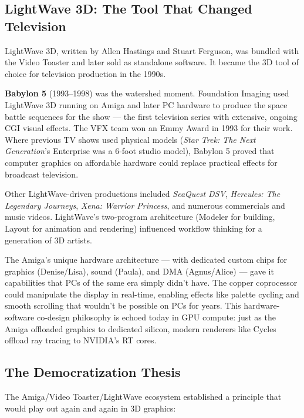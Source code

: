 \documentclass[11pt,letterpaper,twoside,openright]{book}
\begin{document}
\subsection{LightWave 3D: The Tool That Changed Television}

LightWave 3D, written by Allen Hastings and Stuart Ferguson, was bundled with the Video Toaster and later sold as standalone software. It became the 3D tool of choice for television production in the 1990s.

\textbf{Babylon 5} (1993--1998) was the watershed moment. Foundation Imaging used LightWave 3D running on Amiga and later PC hardware to produce the space battle sequences for the show --- the first television series with extensive, ongoing CGI visual effects. The VFX team won an Emmy Award in 1993 for their work. Where previous TV shows used physical models (\textit{Star Trek: The Next Generation}'s Enterprise was a 6-foot studio model), Babylon 5 proved that computer graphics on affordable hardware could replace practical effects for broadcast television.

Other LightWave-driven productions included \textit{SeaQuest DSV}, \textit{Hercules: The Legendary Journeys}, \textit{Xena: Warrior Princess}, and numerous commercials and music videos. LightWave's two-program architecture (Modeler for building, Layout for animation and rendering) influenced workflow thinking for a generation of 3D artists.

\begin{historynote}
The Amiga's unique hardware architecture --- with dedicated custom chips for graphics (Denise/Lisa), sound (Paula), and DMA (Agnus/Alice) --- gave it capabilities that PCs of the same era simply didn't have. The copper coprocessor could manipulate the display in real-time, enabling effects like palette cycling and smooth scrolling that wouldn't be possible on PCs for years. This hardware-software co-design philosophy is echoed today in GPU compute: just as the Amiga offloaded graphics to dedicated silicon, modern renderers like Cycles offload ray tracing to NVIDIA's RT cores.
\end{historynote}

\subsection{The Democratization Thesis}

The Amiga/Video Toaster/LightWave ecosystem established a principle that would play out again and again in 3D graphics:
\end{document}
